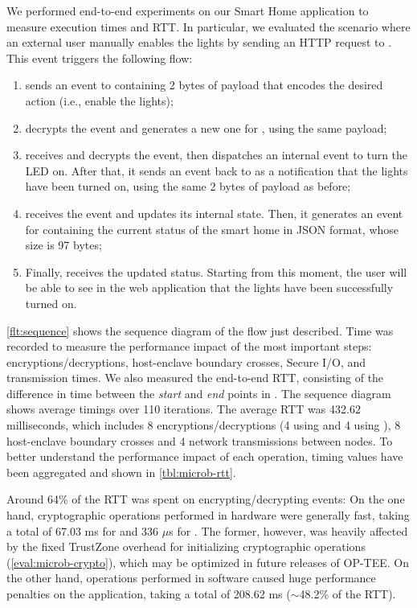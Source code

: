 We performed end-to-end experiments on our Smart Home application to measure
execution times and \ac{RTT}. In particular, we evaluated the scenario where an
external user manually enables the lights by sending an HTTP request to \web.
This event triggers the following flow:
%
\begin{enumerate}
  \item \web{} sends an event to \gateway{} containing 2 bytes of payload that
  encodes the desired action (i.e., enable the lights);
  \item \gateway{} decrypts the event and generates a new one for \light, using
  the same payload;
  \item \light{} receives and decrypts the event, then dispatches an internal
  event to turn the LED on. After that, it sends an event back to \gateway{} as
  a notification that the lights have been turned on, using the same 2 bytes of
  payload as before;
  \item \gateway{} receives the event and updates its internal state. Then, it
  generates an event for \web{} containing the current status of the smart home
  in JSON format, whose size is 97 bytes;
  \item Finally, \web{} receives the updated status. Starting from this moment,
    the user will be able to see in the web application that the lights have
    been successfully turned on.
\end{enumerate}
%
\cref{flt:sequence} shows the sequence diagram of the flow just described. Time
was recorded to measure the performance impact of the most important steps:
encryptions/decryptions, host-enclave boundary crosses, Secure I/O, and
transmission times. We also measured the end-to-end \ac{RTT}, consisting of the
difference in time between the \emph{start} and \emph{end} points in \web. The
sequence diagram shows average timings over 110 iterations. The average \ac{RTT}
was 432.62 milliseconds, which includes 8 encryptions/decryptions (4 using
\aes{} and 4 using \spongent), 8 host-enclave boundary crosses and 4 network
transmissions between nodes. To better understand the performance impact of each
operation, timing values have been aggregated and shown in
\cref{tbl:microb-rtt}.

Around 64\% of the \ac{RTT} was spent on encrypting/decrypting events: On the
one hand, cryptographic operations performed in hardware were generally fast,
taking a total of 67.03 ms for \aes{} and 336 $\mu$s for \spongent. The former,
however, was heavily affected by the fixed TrustZone overhead for initializing
cryptographic operations (\cref{eval:microb-crypto}), which may be optimized in
future releases of OP-TEE. On the other hand, \spongent{} operations performed
in software caused huge performance penalties on the application, taking a total
of 208.62 ms ($\sim$48.2\% of the \ac{RTT}).

